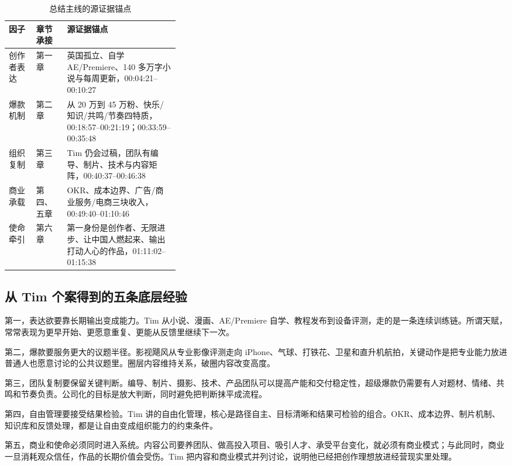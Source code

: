 \documentclass[a4paper]{article}
\begin{document}
\begin{table}[htbp]
  \centering
  \caption{总结主线的源证据锚点}
  \label{tab:summary-evidence-map}
  \small
  \renewcommand{\arraystretch}{1.18}
  \begin{tabularx}{\linewidth}{>{\raggedright\arraybackslash}p{0.16\linewidth}>{\raggedright\arraybackslash}p{0.18\linewidth}>{\raggedright\arraybackslash}X}
    \toprule
    因子 & 章节承接 & 源证据锚点 \\
    \midrule
    创作者表达 & 第一章 & 英国孤立、自学 AE/Premiere、140 多万字小说与每周更新，00:04:21--00:10:27 \\
    爆款机制 & 第二章 & 从 20 万到 45 万粉、快乐/知识/共鸣/节奏四特质，00:18:57--00:21:19；00:33:59--00:35:48 \\
    组织复制 & 第三章 & Tim 仍会过稿，团队有编导、制片、技术与内容矩阵，00:40:37--00:46:38 \\
    商业承载 & 第四、五章 & OKR、成本边界、广告/商业服务/电商三块收入，00:49:40--01:10:46 \\
    使命牵引 & 第六章 & 第一身份是创作者、无限进步、让中国人燃起来、输出打动人心的作品，01:11:02--01:15:38 \\
    \bottomrule
  \end{tabularx}
\end{table}

\subsection{从 Tim 个案得到的五条底层经验}

第一，表达欲要靠长期输出变成能力。Tim 从小说、漫画、AE/Premiere 自学、教程发布到设备评测，走的是一条连续训练链。所谓天赋，常常表现为更早开始、更愿意重复、更能从反馈里继续下一次。

第二，爆款要服务更大的议题半径。影视飓风从专业影像评测走向 iPhone、气球、打铁花、卫星和直升机航拍，关键动作是把专业能力放进普通人也愿意讨论的公共议题里。圈层内容维持关系，破圈内容改变高度。

第三，团队复制要保留关键判断。编导、制片、摄影、技术、产品团队可以提高产能和交付稳定性，超级爆款仍需要有人对题材、情绪、共鸣和节奏负责。公司化的目标是放大判断，同时避免把判断抹平成流程。

第四，自由管理要接受结果检验。Tim 讲的自由化管理，核心是路径自主、目标清晰和结果可检验的组合。OKR、成本边界、制片机制、知识库和反馈处理，都是让自由变成组织能力的约束条件。

第五，商业和使命必须同时进入系统。内容公司要养团队、做高投入项目、吸引人才、承受平台变化，就必须有商业模式；与此同时，商业一旦消耗观众信任，作品的长期价值会受伤。Tim 把内容和商业模式并列讨论，说明他已经把创作理想放进经营现实里处理。
\end{document}
